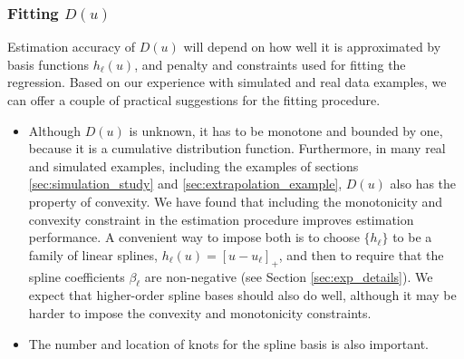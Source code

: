 \documentclass[twoside,11pt]{article}
\begin{document}
\subsubsection*{Fitting  ${D}(u)$}
Estimation accuracy of ${D}(u)$ will depend on how well it is
approximated by basis functions $h_\ell(u)$, and penalty and
constraints used for fitting the regression.  Based on our experience
with simulated and real data examples, we can offer a couple of
practical suggestions for the fitting procedure.

\begin{itemize}
\item Although ${D}(u)$ is unknown, it has to be monotone and bounded by one,
because it is a cumulative distribution function.  Furthermore, in
many real and simulated examples, including the examples of sections \ref{sec:simulation_study} and \ref{sec:extrapolation_example},
${D}(u)$ also has the property
of convexity.  We have found that including the monotonicity and
convexity constraint in the estimation procedure improves estimation
performance.  A convenient way to impose both is to choose $\{h_\ell\}$ to be a family of
linear splines, $h_\ell(u) = [u - u_\ell]_+$, and then to require that
the spline coefficients $\beta_\ell$ are non-negative (see Section \ref{sec:exp_details}). 
We expect that higher-order spline
bases should also do well, although it may be harder to impose the 
convexity and monotonicity constraints.
\item The number and location of knots for the spline basis is also
important.  

\end{itemize}
\end{document}
